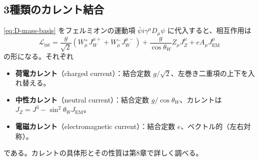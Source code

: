 \documentclass[uplatex,dvipdfmx,a4paper,11pt,openany]{jsbook}
\newcommand{\en}[1]{（#1）}
\numberwithin{equation}{chapter}
\theoremstyle{definition}
\theoremstyle{plain}
\theoremstyle{remark}
\newcommand{\Lag}{\mathcal{L}}
\begin{document}
\subsection{3種類のカレント結合}
\eqref{eq:D-mass-basis} をフェルミオンの運動項 $\bar\psi i\gamma^\mu D_\mu\psi$ に代入すると、相互作用は
\begin{equation}
\Lag_{\mathrm{int}}=\frac{g}{\sqrt2}\left(W^+_\mu J^{\mu+}_W+W^-_\mu J^{\mu-}_W\right)
+\frac{g}{\cos\theta_W}Z_\mu J^\mu_Z+eA_\mu J^\mu_{\mathrm{EM}}
\label{eq:EW-currents}
\end{equation}
の形になる。それぞれ
\begin{itemize}
    \item \textbf{荷電カレント}\en{charged current}：結合定数 $g/\sqrt2$、左巻き二重項の上下を入れ替える。
    \item \textbf{中性カレント}\en{neutral current}：結合定数 $g/\cos\theta_W$、カレントは $J_Z=J^3-\sin^2\theta_WJ_{\mathrm{EM}}$。
    \item \textbf{電磁カレント}\en{electromagnetic current}：結合定数 $e$、ベクトル的（左右対称）。
\end{itemize}
である。カレントの具体形とその性質は第8章で詳しく調べる。
\end{document}
